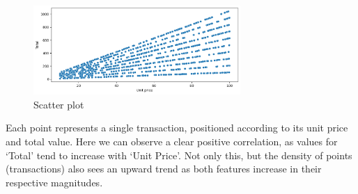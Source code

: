\begin{figure}[h]
    \centering
    \includegraphics[width=0.7\textwidth]{Chapters/ch3/ch_3_scatterplot.png}
    \caption{Scatter plot}
\end{figure}
Each point represents a single transaction, positioned according to its unit price and total value. Here we can observe a clear positive correlation, as values for ‘Total’ tend to increase with ‘Unit Price’. Not only this, but the density of points (transactions) also sees an upward trend as both features increase in their respective magnitudes.

